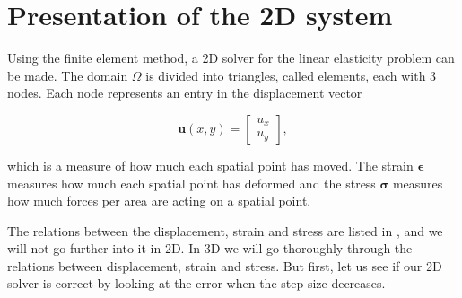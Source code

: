 \section{Presentation of the 2D system}

Using the finite element method, a 2D solver for the linear elasticity problem can be made. The domain $\Omega$ is divided into triangles, called elements, each with 3 nodes. Each node represents an entry in the displacement vector

\begin{equation}
\bm{u}(x,y) = 
\begin{bmatrix}
u_x \\
u_y
\end{bmatrix},
\end{equation}

which is a measure of how much each spatial point has moved. The strain $\bm{\epsilon}$ measures how much each spatial point has deformed and the stress $\bm{\sigma}$ measures how much forces per area are acting on a spatial point. 

The relations between the displacement, strain and stress are listed in \cite{note2}, and we will not go further into it in 2D. In 3D we will go thoroughly through the relations between displacement, strain and stress. But first, let us see if our 2D solver is correct by looking at the error when the step size decreases. 



